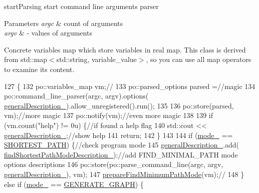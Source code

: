 start\+Parsing start command line arguments parser 


\begin{DoxyParams}{Parameters}
{\em argc} & count of arguments \\
\hline
{\em argv} & -\/ values of arguments \\
\hline
\end{DoxyParams}
Concrete variables map which store variables in real map. This class is derived from std\+::map$<$std\+::string, variable\+\_\+value$>$, so you can use all map operators to examine its content.
\begin{DoxyCode}
127                                                                 \{
132             po::variables\_map vm;\textcolor{comment}{//}
133             po::parsed\_options parsed =\textcolor{comment}{//magic}
134                     po::command\_line\_parser(argc, argv).options(
      \hyperlink{a00002_a1fa87430e08e605b208fd532e73ac236_a1fa87430e08e605b208fd532e73ac236}{generalDescription\_}).allow\_unregistered().run();
135 
136             po::store(parsed, vm);\textcolor{comment}{//more magic}
137             po::notify(vm);\textcolor{comment}{//even more magic}
138 
139             \textcolor{keywordflow}{if} (vm.count(\textcolor{stringliteral}{"help"}) != 0u) \{\textcolor{comment}{//if found a help flag}
140                 std::cout << \hyperlink{a00002_a1fa87430e08e605b208fd532e73ac236_a1fa87430e08e605b208fd532e73ac236}{generalDescription\_};\textcolor{comment}{//show help}
141                 \textcolor{keywordflow}{return};
142             \}
143 
144             \textcolor{keywordflow}{if} (\hyperlink{a00002_ad8127feed7d8312f07ef9a52f6e06f03_ad8127feed7d8312f07ef9a52f6e06f03}{mode\_} == \hyperlink{a00002_a552c30c543bb251f8c43b528ce8d3537_a552c30c543bb251f8c43b528ce8d3537}{SHORTEST\_PATH}) \{\textcolor{comment}{//check program mode}
145                 \hyperlink{a00002_a1fa87430e08e605b208fd532e73ac236_a1fa87430e08e605b208fd532e73ac236}{generalDescription\_}.add(
      \hyperlink{a00002_a6ed91e0b976c665765f35aa51fefba87_a6ed91e0b976c665765f35aa51fefba87}{findShortestPathModeDescription\_});\textcolor{comment}{//add FIND\_MINIMAL\_PATH mode options
       descriptions}
146                 po::store(po::parse\_command\_line(argc, argv, \hyperlink{a00002_a1fa87430e08e605b208fd532e73ac236_a1fa87430e08e605b208fd532e73ac236}{generalDescription\_}), vm);
147                 \hyperlink{a00002_a6d3c420cce837286647b227f1dc3c5d9_a6d3c420cce837286647b227f1dc3c5d9}{prepareFindMinimumPathMode}(vm);\textcolor{comment}{//}
148             \} \textcolor{keywordflow}{else} \textcolor{keywordflow}{if} (\hyperlink{a00002_ad8127feed7d8312f07ef9a52f6e06f03_ad8127feed7d8312f07ef9a52f6e06f03}{mode\_} == \hyperlink{a00002_a4b56bd44886c90debd323f54761489a6_a4b56bd44886c90debd323f54761489a6}{GENERATE\_GRAPH}) \{

\end{DoxyCode}
